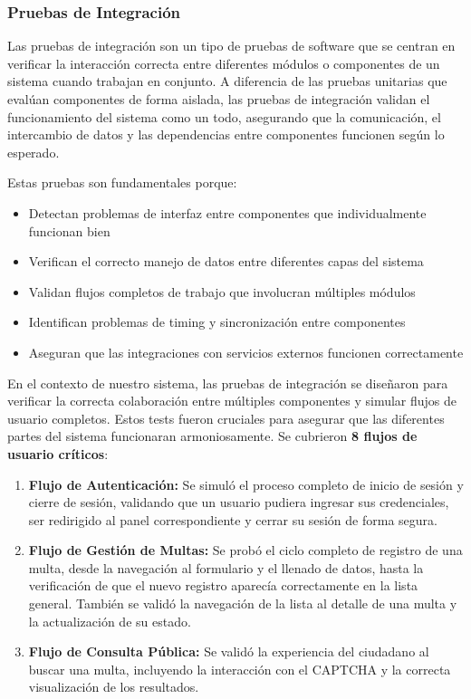 \subsubsection{Pruebas de Integración}

Las pruebas de integración son un tipo de pruebas de software que se centran en verificar la interacción correcta entre diferentes módulos o componentes de un sistema cuando trabajan en conjunto. A diferencia de las pruebas unitarias que evalúan componentes de forma aislada, las pruebas de integración validan el funcionamiento del sistema como un todo, asegurando que la comunicación, el intercambio de datos y las dependencias entre componentes funcionen según lo esperado.

Estas pruebas son fundamentales porque:
\begin{itemize}
    \item Detectan problemas de interfaz entre componentes que individualmente funcionan bien
    \item Verifican el correcto manejo de datos entre diferentes capas del sistema
    \item Validan flujos completos de trabajo que involucran múltiples módulos
    \item Identifican problemas de timing y sincronización entre componentes
    \item Aseguran que las integraciones con servicios externos funcionen correctamente
\end{itemize}

En el contexto de nuestro sistema, las pruebas de integración se diseñaron para verificar la correcta colaboración entre múltiples componentes y simular flujos de usuario completos. Estos tests fueron cruciales para asegurar que las diferentes partes del sistema funcionaran armoniosamente. Se cubrieron \textbf{8 flujos de usuario críticos}:

\begin{enumerate}
    \item \textbf{Flujo de Autenticación:} Se simuló el proceso completo de inicio de sesión y cierre de sesión, validando que un usuario pudiera ingresar sus credenciales, ser redirigido al panel correspondiente y cerrar su sesión de forma segura.
    
    \item \textbf{Flujo de Gestión de Multas:} Se probó el ciclo completo de registro de una multa, desde la navegación al formulario y el llenado de datos, hasta la verificación de que el nuevo registro aparecía correctamente en la lista general. También se validó la navegación de la lista al detalle de una multa y la actualización de su estado.
    
    \item \textbf{Flujo de Consulta Pública:} Se validó la experiencia del ciudadano al buscar una multa, incluyendo la interacción con el CAPTCHA y la correcta visualización de los resultados.
\end{enumerate}

